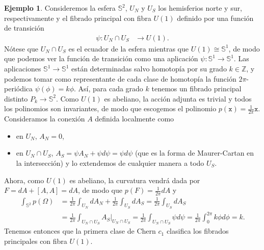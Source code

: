 \documentclass[12pt,a4paper]{article}
\theoremstyle{definition} \newtheorem{defn}[thm]{Definición}
\theoremstyle{definition} \newtheorem{ejemplo}[thm]{Ejemplo}
\theoremstyle{definition} \newtheorem{ejercicio}[thm]{Ejercicio}
\theoremstyle{remark} \newtheorem*{obs}{Observación}
\def\xx{\mathtt{x}}
\def\ZZ{\mathbb{Z}}
\def\SF{\mathbb{S}}
\begin{document}
	   \begin{ejemplo}
	     Consideremos la esfera $\SF^2$, $U_N$ y $U_S$ los hemisferios norte y sur, respectivamente y el fibrado principal con fibra $U(1)$ definido por una función de transición
	     \begin{align*}
	       \psi :U_N\cap U_S&\longrightarrow U(1) .
	       \end{align*}
	       Nótese que $U_N\cap U_S$ es el ecuador de la esfera mientras que $U(1)\cong \SF^1$, de modo que podemos ver la función de transición como una aplicación $\psi:\SF^1 \rightarrow \SF^1$. Las aplicaciones $\SF^1\rightarrow \SF^1$ están determinadas salvo homotopía por su grado $k\in \ZZ$, y podemos tomar como representante de cada clase de homotopía la función $2\pi$-periódica $\psi(\phi)= k\phi$. Así, para cada grado $k$ tenemos un fibrado principal distinto $P_k\rightarrow \SF^2$. Como $U(1)$ es abeliano, la acción adjunta es trivial y todos los polinomios son invariantes, de modo que escogemos el polinomio $p(\xx)=\frac{1}{2\pi}\xx$. Consideramos la conexión $A$ definida localmente como
	       \begin{itemize}
		 \item en $U_N$, $A_N=0$,
		 \item en $U_N\cap U_S$,  $A_S=\psi A_N + \psi d\psi=\psi d\psi$ (que es la forma de Maurer-Cartan en la intersección) y lo extendemos de cualquier manera a todo $U_S$.
	       \end{itemize}
	       Ahora, como $U(1)$ es abeliano, la curvatura vendrá dada por $F=dA+[A,A]=dA$, de modo que $p(F)=\frac{1}{2\pi}dA$ y
	       \begin{align*}
		 \int_{\SF^2} p(\Omega)&=\frac{1}{2\pi} \int_{U_N}dA_N+\frac{1}{2\pi}\int_{U_S}dA_S=\frac{1}{2\pi}\int_{U_S}dA_S\\ &=\frac{1}{2\pi}\int_{U_N\cap U_S}A_S|_{U_N\cap U_S}=\frac{1}{2\pi}\int_{U_N\cap U_S}\psi d\psi= \frac{1}{2\pi} \int_0^{2\pi} k\phi d\phi = k.
	       \end{align*}
	       Tenemos entonces que la primera clase de Chern $c_1$ clasifica los fibrados principales con fibra $U(1)$.
	   \end{ejemplo}
\end{document}
